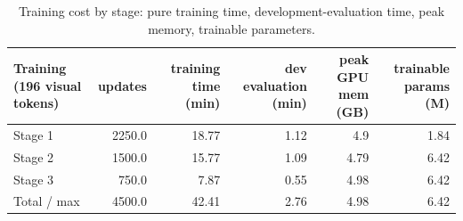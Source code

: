 \begin{table}[t]
\centering\small
\begin{tabular}{lrrrrr}
\toprule
Training (196 visual tokens) & updates & training time (min) & dev evaluation (min) & peak GPU mem (GB) & trainable params (M) \\
\midrule
Stage 1 & 2250.0 & 18.77 & 1.12 & 4.9 & 1.84 \\
Stage 2 & 1500.0 & 15.77 & 1.09 & 4.79 & 6.42 \\
Stage 3 & 750.0 & 7.87 & 0.55 & 4.98 & 6.42 \\
Total / max & 4500.0 & 42.41 & 2.76 & 4.98 & 6.42 \\
\bottomrule
\end{tabular}
\caption{Training cost by stage: pure training time, development-evaluation time, peak memory, trainable parameters.}
\label{tab:task2_resources_training}
\end{table}
